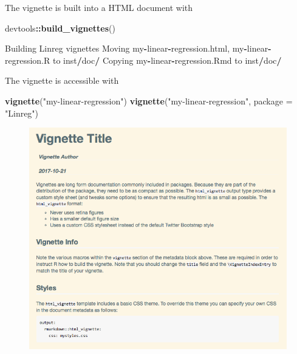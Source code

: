 \documentclass[]{book}
\newenvironment{Shaded}{\begin{snugshade}}{\end{snugshade}}
\newcommand{\KeywordTok}[1]{\textcolor[rgb]{0.13,0.29,0.53}{\textbf{#1}}}
\newcommand{\DataTypeTok}[1]{\textcolor[rgb]{0.13,0.29,0.53}{#1}}
\newcommand{\StringTok}[1]{\textcolor[rgb]{0.31,0.60,0.02}{#1}}
\newcommand{\OperatorTok}[1]{\textcolor[rgb]{0.81,0.36,0.00}{\textbf{#1}}}
\newcommand{\NormalTok}[1]{#1}
\theoremstyle{definition}
\theoremstyle{definition}
\theoremstyle{definition}
\theoremstyle{remark}
\begin{document}
The vignette is built into a HTML document with

\begin{Shaded}
\begin{Highlighting}[]
\NormalTok{devtools}\OperatorTok{::}\KeywordTok{build_vignettes}\NormalTok{()}
\end{Highlighting}
\end{Shaded}

\begin{Shaded}
\begin{Highlighting}[]
\NormalTok{Building Linreg vignettes}
\NormalTok{Moving my}\OperatorTok{-}\NormalTok{linear}\OperatorTok{-}\NormalTok{regression.html, my}\OperatorTok{-}\NormalTok{linear}\OperatorTok{-}\NormalTok{regression.R to inst}\OperatorTok{/}\NormalTok{doc}\OperatorTok{/}
\NormalTok{Copying my}\OperatorTok{-}\NormalTok{linear}\OperatorTok{-}\NormalTok{regression.Rmd to inst}\OperatorTok{/}\NormalTok{doc}\OperatorTok{/}
\end{Highlighting}
\end{Shaded}

The vignette is accessible with

\begin{Shaded}
\begin{Highlighting}[]
\KeywordTok{vignette}\NormalTok{(}\StringTok{"my-linear-regression"}\NormalTok{)}
\KeywordTok{vignette}\NormalTok{(}\StringTok{"my-linear-regression"}\NormalTok{, }\DataTypeTok{package =} \StringTok{"Linreg"}\NormalTok{)}
\end{Highlighting}
\end{Shaded}

\begin{figure}

{\centering \includegraphics[width=10.33in]{images/ch3_vignette_html} 

}

\end{figure}
\end{document}
